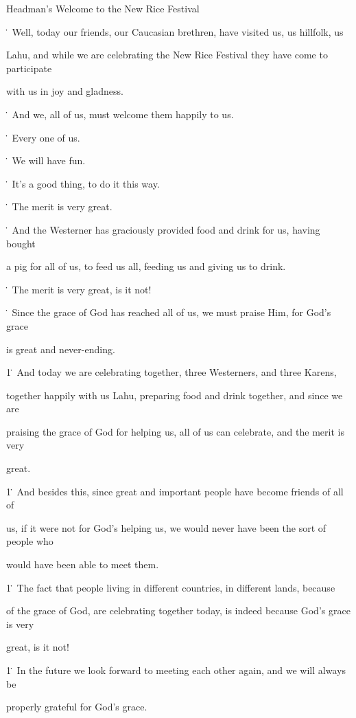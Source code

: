 
\begin{center}
Headman's Welcome to the New Rice Festival
\end{center}

\leftskip=0pt
\. Well, today our friends, our Caucasian brethren, have visited us, us hillfolk,
us

Lahu, and while we are celebrating the New Rice Festival they have come to participate

with us in joy and gladness.

\. And we, all of us, must welcome them happily to us.

\. Every one of us.

\. We will have fun.

\. It's a good thing, to do it this way.

\. The merit is very great.

\. And the Westerner has graciously provided food and drink for us, having bought

a pig for all of us, to feed us all, feeding us and giving us to drink.

\. The merit is very great, is it not!

\. Since the grace of God has reached all of us, we must praise Him, for God's
grace

is great and never-ending.

1\. And today we are celebrating together, three Westerners, and three Karens,

together happily with us Lahu, preparing food and drink together, and since we
are

praising the grace of God for helping us, all of us can celebrate, and the merit
is very

great.

1\. And besides this, since great and important people have become friends of all
of

us, if it were not for God's helping us, we would never have been the sort of people
who

would have been able to meet them.

1\. The fact that people living in different countries, in different lands, because

of the grace of God, are celebrating together today, is indeed because God's grace
is very

great, is it not!

1\. In the future we look forward to meeting each other again, and we will always
be

properly grateful for God's grace.


